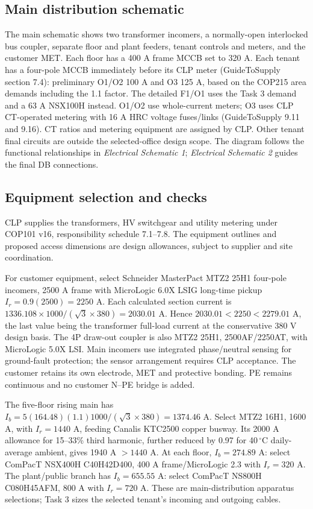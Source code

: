 \subsection*{Main distribution schematic}
The main schematic shows two transformer incomers, a normally-open interlocked bus coupler, separate floor and plant feeders, tenant controls and meters, and the customer MET. Each floor has a 400 A frame MCCB set to 320 A. Each tenant has a four-pole MCCB immediately before its CLP meter (GuideToSupply section 7.4): preliminary O1/O2 100 A and O3 125 A, based on the COP215 area demands including the 1.1 factor. The detailed F1/O1 uses the Task 3 demand and a 63 A NSX100H instead. O1/O2 use whole-current meters; O3 uses CLP CT-operated metering with 16 A HRC voltage fuses/links (GuideToSupply 9.11 and 9.16). CT ratios and metering equipment are assigned by CLP. Other tenant final circuits are outside the selected-office design scope. The diagram follows the functional relationships in \emph{Electrical Schematic 1}; \emph{Electrical Schematic 2} guides the final DB connections.

\subsection*{Equipment selection and checks}
CLP supplies the transformers, HV switchgear and utility metering under COP101 v16, responsibility schedule 7.1--7.8. The equipment outlines and proposed access dimensions are design allowances, subject to supplier and site coordination.

For customer equipment, select Schneider MasterPact MTZ2 25H1 four-pole incomers, 2500 A frame with MicroLogic 6.0X LSIG long-time pickup $I_r=0.9(2500)=2250$ A. Each calculated section current is $1336.108\times1000/(\sqrt3\times380)=2030.01$ A. Hence $2030.01<2250<2279.01$ A, the last value being the transformer full-load current at the conservative 380 V design basis. The 4P draw-out coupler is also MTZ2 25H1, 2500AF/2250AT, with MicroLogic 5.0X LSI. Main incomers use integrated phase/neutral sensing for ground-fault protection; the sensor arrangement requires CLP acceptance. The customer retains its own electrode, MET and protective bonding. PE remains continuous and no customer N--PE bridge is added.

The five-floor rising main has $I_b=5(164.48)(1.1)1000/(\sqrt3\times380)=1374.46$ A. Select MTZ2 16H1, 1600 A, with $I_r=1440$ A, feeding Canalis KTC2500 copper busway. Its 2000 A allowance for 15--33\% third harmonic, further reduced by 0.97 for 40\,$^\circ$C daily-average ambient, gives 1940 A $>1440$ A. At each floor, $I_b=274.89$ A: select ComPacT NSX400H C40H42D400, 400 A frame/MicroLogic 2.3 with $I_r=320$ A. The plant/public branch has $I_b=655.55$ A: select ComPacT NS800H C080H45AFM, 800 A with $I_r=720$ A. These are main-distribution apparatus selections; Task 3 sizes the selected tenant's incoming and outgoing cables.

